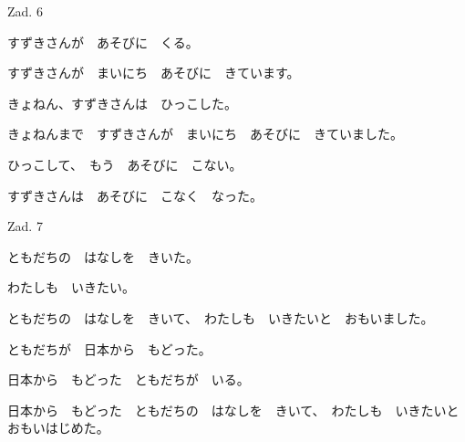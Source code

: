 	\begin{mondai}{Zad. 6}
		\item すずきさんが　あそびに　くる。
		\item すずきさんが　まいにち　あそびに　きています。
		\item きょねん、すずきさんは　ひっこした。
		\item きょねんまで　すずきさんが　まいにち　あそびに　きていました。
		\item ひっこして、　もう　あそびに　こない。
		\item すずきさんは　あそびに　こなく　なった。
	\end{mondai}

	\begin{mondai}{Zad. 7}
		\item ともだちの　はなしを　きいた。
		\item わたしも　いきたい。
		\item ともだちの　はなしを　きいて、　わたしも　いきたいと　おもいました。
		\item ともだちが　日本から　もどった。
		\item 日本から　もどった　ともだちが　いる。
		\item 日本から　もどった　ともだちの　はなしを　きいて、　わたしも　いきたいと　おもいはじめた。
	\end{mondai}
